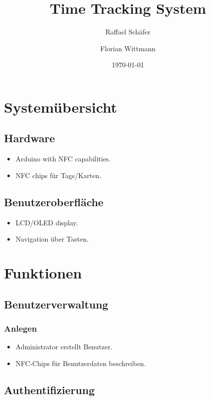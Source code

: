 \documentclass{article}
\title{Time Tracking System}
\author{Raffael Schäfer \and Florian Wittmann}
\date{\today}
\begin{document}
\maketitle

\section*{Systemübersicht}

\subsection*{Hardware}
\begin{itemize}
  \item Arduino with NFC capabilities.
  \item NFC chips für Tags/Karten.
\end{itemize}

\subsection*{Benutzeroberfläche}
\begin{itemize}
  \item LCD/OLED display.
  \item Navigation über Tasten.
\end{itemize}

\section*{Funktionen}

\subsection*{Benutzerverwaltung}

\subsubsection*{Anlegen}
\begin{itemize}
  \item Administrator erstellt Benutzer.
  \item NFC-Chips für Benutzerdaten beschreiben.
\end{itemize}

\subsection*{Authentifizierung}
\end{document}
